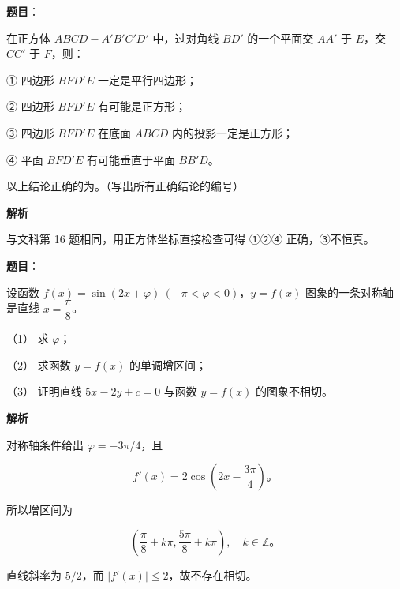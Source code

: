 \begin{answer}

\textbf{题目}：

在正方体 $ABCD-A'B'C'D'$ 中，过对角线 $BD'$ 的一个平面交 $AA'$ 于 $E$，交 $CC'$ 于 $F$，则：

① 四边形 $BFD'E$ 一定是平行四边形；

② 四边形 $BFD'E$ 有可能是正方形；

③ 四边形 $BFD'E$ 在底面 $ABCD$ 内的投影一定是正方形；

④ 平面 $BFD'E$ 有可能垂直于平面 $BB'D$。

以上结论正确的为\gkblank{}。（写出所有正确结论的编号）

\textbf{解析}

与文科第 16 题相同，用正方体坐标直接检查可得 ①②④ 正确，③不恒真。


\end{answer}
\begin{answer}

\textbf{题目}：

设函数 $f(x)=\sin(2x+\varphi)\ (-\pi<\varphi<0)$，$y=f(x)$ 图象的一条对称轴是直线 $x=\dfrac{\pi}{8}$。

（1） 求 $\varphi$；

（2） 求函数 $y=f(x)$ 的单调增区间；

（3） 证明直线 $5x-2y+c=0$ 与函数 $y=f(x)$ 的图象不相切。

\textbf{解析}


对称轴条件给出 $\varphi=-3\pi/4$，且

\nopagebreak[4]
\[
f'(x)=2\cos\left(2x-\frac{3\pi}{4}\right)\text{。}
\]


所以增区间为

\nopagebreak[4]
\[
\left(\frac\pi8+k\pi,\frac{5\pi}{8}+k\pi\right),\quad k\in\mathbb Z\text{。}
\]


直线斜率为 $5/2$，而 $|f'(x)|\leqslant2$，故不存在相切。




\end{answer}
